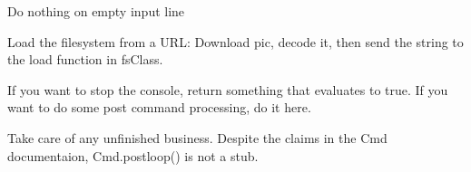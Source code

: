 \documentclass[letterpaper,10pt,english]{sphinxmanual}
\begin{document}
\begin{fulllineitems}
\begin{fulllineitems}
\label{main:main.Console.emptyline}
Do nothing on empty input line

\end{fulllineitems}


\begin{fulllineitems}
\label{main:main.Console.init_factory}
\end{fulllineitems}


\begin{fulllineitems}
\label{main:main.Console.loadfs}
Load the filesystem from a URL: Download pic, decode it, then send the string to the load function in fsClass.

\end{fulllineitems}


\begin{fulllineitems}
\label{main:main.Console.open_window}
\end{fulllineitems}


\begin{fulllineitems}
\label{main:main.Console.postcmd}
If you want to stop the console, return something that evaluates to true.
If you want to do some post command processing, do it here.

\end{fulllineitems}


\begin{fulllineitems}
\label{main:main.Console.postloop}
Take care of any unfinished business.
Despite the claims in the Cmd documentaion,
Cmd.postloop() is not a stub.

\end{fulllineitems}



\end{fulllineitems}
\end{document}
